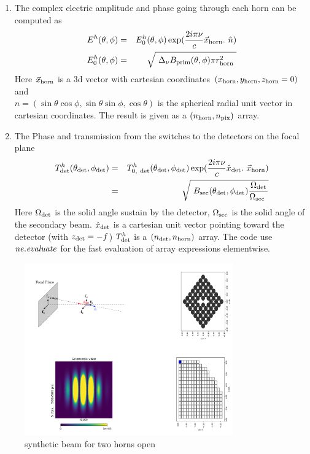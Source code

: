 \documentclass[a4paper, 11pt]{article}
\def\ba{\begin{eqnarray}}
\def\ea{\end{eqnarray}}
\begin{document}
\begin{enumerate}
\item The complex electric amplitude and phase going through each horn can be computed as 
\ba
E^h(\theta,\phi)&=& E^h_{0}(\theta,\phi) \exp ( \frac{2 i \pi \nu} {c} \vec{x}_{\rm horn}. \hat{n})  \\
 E^h_{0}(\theta,\phi)&=& \sqrt{ \Delta_{\nu} B_{\rm prim}(\theta, \phi) \pi r^{2}_{\rm horn} }
\ea
Here $\vec{x}_{\rm horn}$ is a 3d vector with cartesian coordinates $(x_{\rm horn},y_{\rm horn},z_{\rm horn}=0)$ and \\ $\hat{n}=(\sin \theta \cos \phi, \sin \theta \sin \phi, \cos \theta)$ is the spherical radial unit vector in cartesian coordinates.
The result is given as a $(n_{\rm horn}, n_{\rm pix})$ array.
\item The Phase and transmission from the switches to the detectors on the focal plane
\ba
T^{h}_{\rm det} (\theta_{\rm det}, \phi_{\rm det}) &=&T^{h}_{0, { \rm det} }(\theta_{\rm det}, \phi_{\rm det}) \exp ( \frac{2 i \pi \nu} {c} \hat{x}_{\rm det}. \vec{x}_{\rm horn}) \\
&=& \sqrt{  B_{\rm sec}(\theta_{\rm det}, \phi_{\rm det}) \frac{\Omega_{\rm det}}{\Omega_{\rm sec} }}
\ea
Here $\Omega_{\rm det}$ is the solid angle sustain by the detector, $\Omega_{\rm sec}$ is the solid angle of the secondary beam. $\hat{x}_{\rm det}$ is a cartesian unit vector pointing toward the detector  (with $z_{\rm det}=-f$)
$T^{h}_{\rm det}$ is a $(n_{\rm det}, n_{\rm horn})$ array. The code use $\it{ne.evaluate}$ for the fast evaluation of array expressions elementwise.
\end{enumerate}
\begin{figure}
  \centering
  \includegraphics[width=0.8\textwidth]{synthetic_beam_2horn_open_000.png}
  \caption{synthetic beam for two horns open}
  \label{fig:prim_second_beam}
\end{figure}
\end{document}

